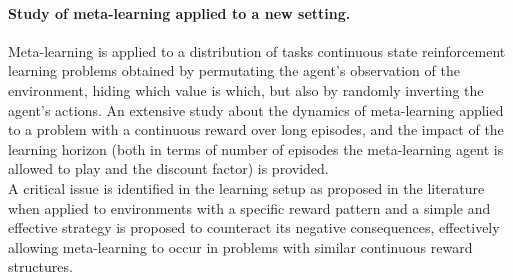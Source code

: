 \paragraph{Study of meta-learning applied to a new setting.} Meta-learning is applied
to a distribution of tasks continuous state reinforcement learning problems
obtained by permutating the agent's observation of the environment, hiding
which value is which, but also by randomly inverting the agent's actions. 
An extensive
study about the dynamics of meta-learning applied to a problem with a continuous
reward over long episodes, and the impact of the learning horizon (both
in terms of number of episodes the meta-learning agent is allowed to play
and the discount factor) is provided. \\

A critical issue is identified in the learning setup as proposed in the
literature when applied to environments with a specific reward pattern
and a simple and effective strategy is proposed to counteract its
negative consequences, effectively allowing meta-learning to occur in
problems with similar continuous reward structures.
